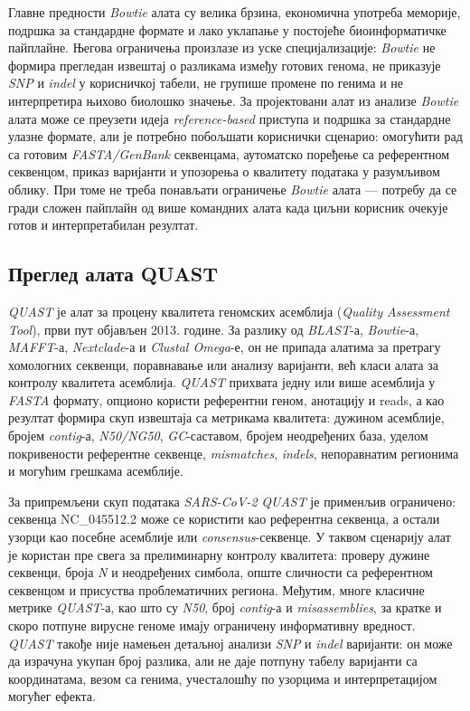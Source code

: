 \documentclass[12pt,oneside]{memoir}
\begin{document}
Главне предности \textit{Bowtie} алата су велика брзина, економична употреба меморије, подршка за стандардне формате и лако уклапање у постојеће биоинформатичке пайплайне. Његова ограничења произлазе из уске специјализације: \textit{Bowtie} не формира прегледан извештај о разликама између готових генома, не приказује \textit{SNP} и \textit{indel} у корисничкој табели, не групише промене по генима и не интерпретира њихово биолошко значење. За пројектовани алат из анализе \textit{Bowtie} алата може се преузети идеја \textit{reference-based} приступа и подршка за стандардне улазне формате, али је потребно побољшати кориснички сценарио: омогућити рад са готовим \textit{FASTA/GenBank} секвенцама, аутоматско поређење са референтном секвенцом, приказ варијанти и упозорења о квалитету података у разумљивом облику. При томе не треба понављати ограничење \textit{Bowtie} алата — потребу да се гради сложен пайплайн од више командних алата када циљни корисник очекује готов и интерпретабилан резултат.

\subsection{Преглед алата QUAST}
\textit{QUAST} је алат за процену квалитета геномских асемблија (\textit{Quality Assessment Tool}), први пут објављен 2013. године\cite{gurevich2013quast}. За разлику од \textit{BLAST}-а, \textit{Bowtie}-а, \textit{MAFFT}-а, \textit{Nextclade}-а и \textit{Clustal Omega}-е, он не припада алатима за претрагу хомологних секвенци, поравнавање или анализу варијанти, већ класи алата за контролу квалитета асемблија. \textit{QUAST} прихвата једну или више асемблија у \textit{FASTA} формату, опционо користи референтни геном, анотацију и reads, а као резултат формира скуп извештаја са метрикама квалитета: дужином асемблије, бројем \textit{contig}-а, \textit{N50/NG50}, \textit{GC}-саставом, бројем неодређених база, уделом покривености референтне секвенце, \textit{mismatches}, \textit{indels}, непоравнатим регионима и могућим грешкама асемблије.

За припремљени скуп података \textit{SARS-CoV-2} \textit{QUAST} је применљив ограничено: секвенца NC\_045512.2 може се користити као референтна секвенца, а остали узорци као посебне асемблије или \textit{consensus}-секвенце. У таквом сценарију алат је користан пре свега за прелиминарну контролу квалитета: проверу дужине секвенци, броја \textit{N} и неодређених симбола, опште сличности са референтном секвенцом и присуства проблематичних региона. Међутим, многе класичне метрике \textit{QUAST}-а, као што су \textit{N50}, број \textit{contig}-а и \textit{misassemblies}, за кратке и скоро потпуне вирусне геноме имају ограничену информативну вредност. \textit{QUAST} такође није намењен детаљној анализи \textit{SNP} и \textit{indel} варијанти: он може да израчуна укупан број разлика, али не даје потпуну табелу варијанти са координатама, везом са генима, учесталошћу по узорцима и интерпретацијом могућег ефекта.
\end{document}
